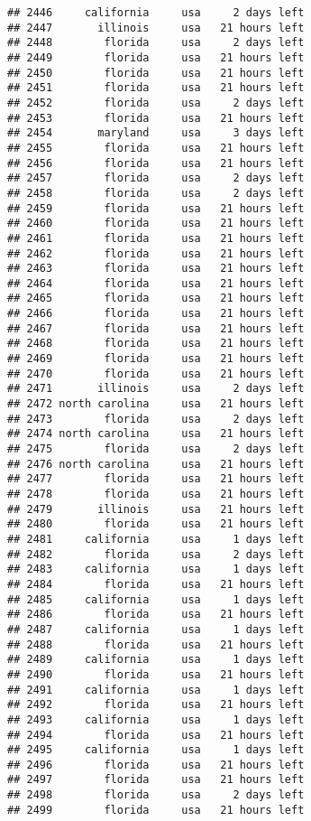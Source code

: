 \documentclass[
]{article}
\begin{document}
\begin{verbatim}
## 2446     california     usa     2 days left
## 2447       illinois     usa   21 hours left
## 2448        florida     usa     2 days left
## 2449        florida     usa   21 hours left
## 2450        florida     usa   21 hours left
## 2451        florida     usa   21 hours left
## 2452        florida     usa     2 days left
## 2453        florida     usa   21 hours left
## 2454       maryland     usa     3 days left
## 2455        florida     usa   21 hours left
## 2456        florida     usa   21 hours left
## 2457        florida     usa     2 days left
## 2458        florida     usa     2 days left
## 2459        florida     usa   21 hours left
## 2460        florida     usa   21 hours left
## 2461        florida     usa   21 hours left
## 2462        florida     usa   21 hours left
## 2463        florida     usa   21 hours left
## 2464        florida     usa   21 hours left
## 2465        florida     usa   21 hours left
## 2466        florida     usa   21 hours left
## 2467        florida     usa   21 hours left
## 2468        florida     usa   21 hours left
## 2469        florida     usa   21 hours left
## 2470        florida     usa   21 hours left
## 2471       illinois     usa     2 days left
## 2472 north carolina     usa   21 hours left
## 2473        florida     usa     2 days left
## 2474 north carolina     usa   21 hours left
## 2475        florida     usa     2 days left
## 2476 north carolina     usa   21 hours left
## 2477        florida     usa   21 hours left
## 2478        florida     usa   21 hours left
## 2479       illinois     usa   21 hours left
## 2480        florida     usa   21 hours left
## 2481     california     usa     1 days left
## 2482        florida     usa     2 days left
## 2483     california     usa     1 days left
## 2484        florida     usa   21 hours left
## 2485     california     usa     1 days left
## 2486        florida     usa   21 hours left
## 2487     california     usa     1 days left
## 2488        florida     usa   21 hours left
## 2489     california     usa     1 days left
## 2490        florida     usa   21 hours left
## 2491     california     usa     1 days left
## 2492        florida     usa   21 hours left
## 2493     california     usa     1 days left
## 2494        florida     usa   21 hours left
## 2495     california     usa     1 days left
## 2496        florida     usa   21 hours left
## 2497        florida     usa   21 hours left
## 2498        florida     usa     2 days left
## 2499        florida     usa   21 hours left
\end{verbatim}
\end{document}
